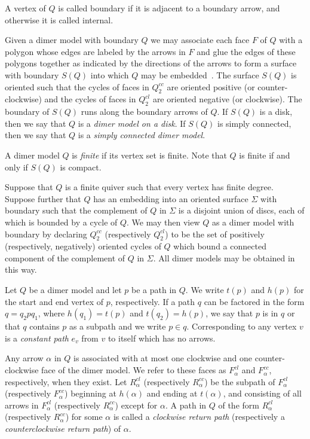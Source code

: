 \documentclass{article}
\theoremstyle{definition}
\begin{document}
A vertex of $Q$ is called boundary if it is adjacent to a boundary arrow, and otherwise it is called internal. 

Given a dimer model with boundary $Q$ we may associate each face $F$ of $Q$ with a polygon whose edges are labeled by the arrows in $F$ and glue the edges of these polygons together as indicated by the directions of the arrows to form a surface with boundary $S(Q)$ into which $Q$ may be embedded~\cite[Lemma 6.4]{XBocklandt2009}. The surface $S(Q)$ is oriented such that the cycles of faces in $Q_2^{cc}$ are oriented positive (or counter-clockwise) and the cycles of faces in $Q_2^{cl}$ are oriented negative (or clockwise). The boundary of $S(Q)$ runs along the boundary arrows of $Q$. If $S(Q)$ is a disk, then we say that $Q$ is a \textit{dimer model on a disk}. If $S(Q)$ is simply connected, then we say that $Q$ is a \textit{simply connected dimer model}.

A dimer model $Q$ is \textit{finite} if its vertex set is finite. Note that $Q$ is finite if and only if $S(Q)$ is compact.

Suppose that $Q$ is a finite quiver 
such that every vertex has finite degree. Suppose further that $Q$ has an embedding into an oriented surface $\Sigma$ with boundary such that the complement of $Q$ in $\Sigma$ is a disjoint union of discs, each of which is bounded by a cycle of $Q$. We may then view $Q$ as a dimer model with boundary by declaring $Q_2^{cc}$ (respectively $Q_2^{cl}$) to be the set of positively (respectively, negatively) oriented cycles of $Q$ which bound a connected component of the complement of $Q$ in $\Sigma$. All dimer models may be obtained in this way.

Let $Q$ be a dimer model and let $p$ be a path in $Q$. We write $t(p)$ and $h(p)$ for the start and end vertex of $p$, respectively. If a path $q$ can be factored in the form $q=q_2pq_1$, where $h(q_1)=t(p)$ and $t(q_2)=h(p)$, we say that $p$ is in $q$ or that $q$ contains $p$ as a subpath and we write $p\in q$. Corresponding to any vertex $v$ is a \textit{constant path} $e_v$ from $v$ to itself which has no arrows. 

Any arrow $\alpha$ in $Q$ is associated with at most one clockwise and one counter-clockwise face of the dimer model. We refer to these faces as $F_\alpha^{cl}$ and $F_\alpha^{cc}$, respectively, when they exist. Let $R_\alpha^{cl}$ (respectively $R_\alpha^{cc}$) be the subpath of $F_\alpha^{cl}$ (respectively $F_\alpha^{cc}$) beginning at $h(\alpha)$ and ending at $t(\alpha)$, and consisting of all arrows in $F_\alpha^{cl}$ (respectively $R_\alpha^{cc}$) except for $\alpha$. A path in $Q$ of the form $R_\alpha^{cl}$ (respectively $R_\alpha^{cc}$) for some $\alpha$ is called a \textit{clockwise return path} (respectively a \textit{counterclockwise return path}) of $\alpha$. 
\end{document}
